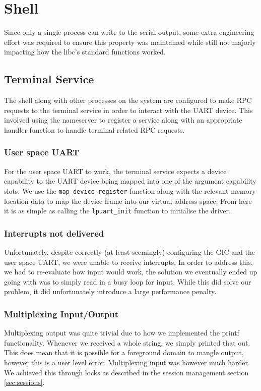 \chapter{Shell}
Since only a single process can write to the serial output, some extra engineering effort was required to ensure this property was maintained while still not majorly impacting how the libc's standard functions worked. 

\section{Terminal Service}
The shell along with other processes on the system are configured to make RPC requests to the terminal service in order to interact with the UART device. This involved using the nameserver to register a service along with an appropriate handler function to handle terminal related RPC requests. 

\subsection{User space UART}
For the user space UART to work, the terminal service expects a device capability to the UART device being mapped into one of the argument capability slots. We use the \texttt{map_device_register} function along with the relevant memory location data to map the device frame into our virtual address space. From here it is as simple as calling the \texttt{lpuart_init} function to initialise the driver. 

\subsection{Interrupts not delivered}
Unfortunately, despite correctly (at least seemingly) configuring the GIC and the user space UART, we were unable to receive interrupts. In order to address this, we had to re-evaluate how input would work, the solution we eventually ended up going with was to simply read in a busy loop for input. While this did solve our problem, it did unfortunately introduce a large performance penalty. 

\subsection{Multiplexing Input/Output}
Multiplexing output was quite trivial due to how we implemented the printf functionality. Whenever we received a whole string, we simply printed that out. This does mean that it is possible for a foreground domain to mangle output, however this is a user level error. Multiplexing input was however much harder. We achieved this through locks as described in the session management section \ref{sec:sessions}.

